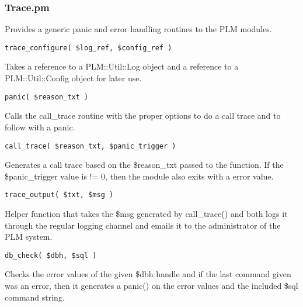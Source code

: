 \subsubsection{Trace.pm}
Provides a generic panic and error handling routines to the PLM modules.

\begin{verbatim}
trace_configure( $log_ref, $config_ref )
\end{verbatim}
Takes a reference to a PLM::Util::Log object and a reference to a PLM::Util::Config 
object for later use.

\begin{verbatim}
panic( $reason_txt )
\end{verbatim}
Calls the call\_trace routine with the proper options to do a call trace and 
to follow with a panic.

\begin{verbatim}
call_trace( $reason_txt, $panic_trigger )
\end{verbatim}
Generates a call trace based on the \$reason\_txt passed to the function.  
If the \$panic\_trigger value is != 0, then the module also exits with a 
error value.

\begin{verbatim}
trace_output( $txt, $msg )
\end{verbatim}
Helper function that takes the \$msg generated by call\_trace() and both logs
it through the regular logging channel and emails it to the administrator of 
the PLM system.

\begin{verbatim}
db_check( $dbh, $sql )
\end{verbatim}
Checks the error values of the given \$dbh handle and if the last command 
given was an error, then it generates a panic() on the error values and the
included \$sql command string.
